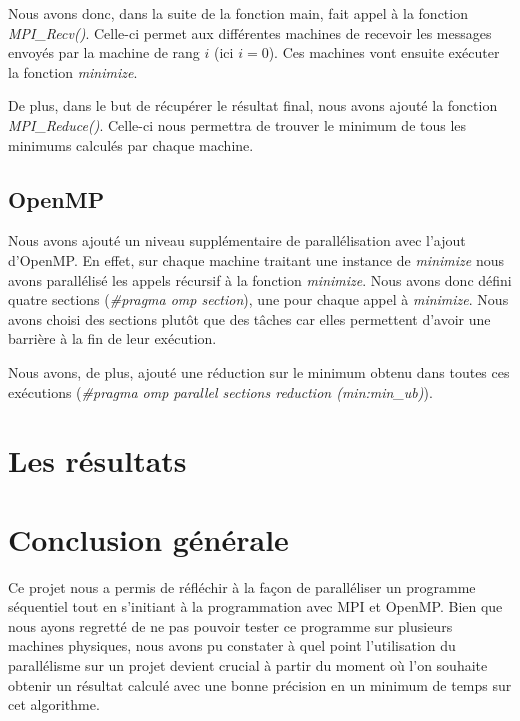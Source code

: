 \documentclass[a4paper,10pt]{article}
\begin{document}
Nous avons donc, dans la suite de la fonction main, fait appel à la fonction \emph{MPI\_Recv()}. Celle-ci permet aux différentes machines de recevoir les messages envoyés par la machine de rang $i$ (ici $i=0$). Ces machines vont ensuite exécuter la fonction \emph{minimize}. 

De plus, dans le but de récupérer le résultat final, nous avons ajouté la fonction \emph{MPI\_Reduce()}. Celle-ci nous permettra de trouver le minimum de tous les minimums calculés par chaque machine. 

\subsection{OpenMP}
Nous avons ajouté un niveau supplémentaire de parallélisation avec l'ajout d'OpenMP. En effet, sur chaque machine traitant une instance de \emph{minimize} nous avons parallélisé les appels récursif à la fonction \emph{minimize}. 
Nous avons donc défini quatre sections (\emph{\#pragma omp section}), une pour chaque appel à \emph{minimize}. Nous avons choisi des sections plutôt que des tâches car elles permettent d'avoir une barrière à la fin de leur exécution. 

Nous avons, de plus, ajouté une réduction sur le minimum obtenu dans toutes ces exécutions (\emph{\#pragma omp parallel sections reduction (min:min\_ub)}).


\newpage
\section{Les résultats}





\newpage
\section{Conclusion générale}
Ce projet nous a permis de réfléchir à la façon de paralléliser un programme séquentiel tout en s'initiant à la programmation avec MPI et OpenMP. 
Bien que nous ayons regretté de ne pas pouvoir tester ce programme 
sur plusieurs machines physiques, nous avons pu constater 
à quel point l'utilisation du parallélisme sur un projet 
devient crucial à partir du moment où l'on souhaite obtenir un résultat calculé
avec une bonne précision en un minimum de temps sur cet algorithme. 
\end{document}
